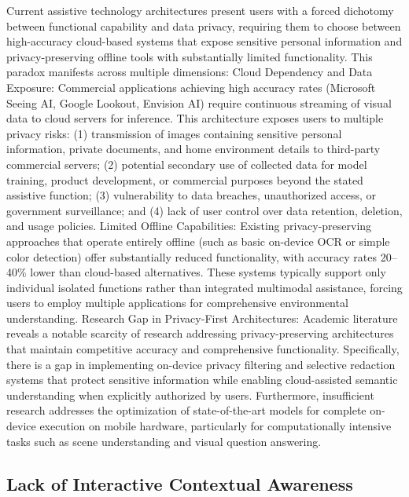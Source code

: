 \documentclass[12pt,a4paper]{report}
\begin{document}
Current assistive technology architectures present users with a forced dichotomy between functional capability and data privacy, requiring them to choose between high-accuracy cloud-based systems that expose sensitive personal information and privacy-preserving offline tools with substantially limited functionality. This paradox manifests across multiple dimensions: Cloud Dependency and Data Exposure: Commercial applications achieving high accuracy rates (Microsoft Seeing AI, Google Lookout, Envision AI) require continuous streaming of visual data to cloud servers for inference. This architecture exposes users to multiple privacy risks: (1) transmission of images containing sensitive personal information, private documents, and home environment details to third-party commercial servers; (2) potential secondary use of collected data for model training, product development, or commercial purposes beyond the stated assistive function; (3) vulnerability to data breaches, unauthorized access, or government surveillance; and (4) lack of user control over data retention, deletion, and usage policies. Limited Offline Capabilities: Existing privacy-preserving approaches that operate entirely offline (such as basic on-device OCR or simple color detection) offer substantially reduced functionality, with accuracy rates 20--40\% lower than cloud-based alternatives. These systems typically support only individual isolated functions rather than integrated multimodal assistance, forcing users to employ multiple applications for comprehensive environmental understanding. Research Gap in Privacy-First Architectures: Academic literature reveals a notable scarcity of research addressing privacy-preserving architectures that maintain competitive accuracy and comprehensive functionality. Specifically, there is a gap in implementing on-device privacy filtering and selective redaction systems that protect sensitive information while enabling cloud-assisted semantic understanding when explicitly authorized by users. Furthermore, insufficient research addresses the optimization of state-of-the-art models for complete on-device execution on mobile hardware, particularly for computationally intensive tasks such as scene understanding and visual question answering.

\subsection{Lack of Interactive Contextual Awareness}
\end{document}
